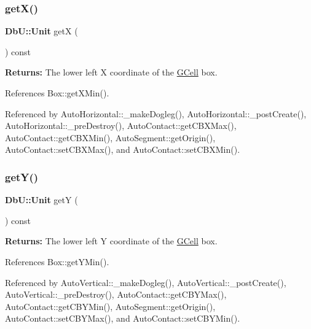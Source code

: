 \mbox{\label{classKatabatic_1_1GCell_a00b8f54c8171f6699e57de1b8c18eeb1}} 
\subsubsection{\texorpdfstring{get\+X()}{getX()}}
{\footnotesize\ttfamily \textbf{ Db\+U\+::\+Unit} getX (\begin{DoxyParamCaption}{ }\end{DoxyParamCaption}) const\hspace{0.3cm}{\ttfamily [inline]}}

{\bfseries Returns\+:} The lower left X coordinate of the \mbox{\hyperlink{classKatabatic_1_1GCell}{G\+Cell}} box. 

References Box\+::get\+X\+Min().



Referenced by Auto\+Horizontal\+::\+\_\+make\+Dogleg(), Auto\+Horizontal\+::\+\_\+post\+Create(), Auto\+Horizontal\+::\+\_\+pre\+Destroy(), Auto\+Contact\+::get\+C\+B\+X\+Max(), Auto\+Contact\+::get\+C\+B\+X\+Min(), Auto\+Segment\+::get\+Origin(), Auto\+Contact\+::set\+C\+B\+X\+Max(), and Auto\+Contact\+::set\+C\+B\+X\+Min().

\mbox{\label{classKatabatic_1_1GCell_a4580de6b074712e400d5d238ce3af054}} 
\subsubsection{\texorpdfstring{get\+Y()}{getY()}}
{\footnotesize\ttfamily \textbf{ Db\+U\+::\+Unit} getY (\begin{DoxyParamCaption}{ }\end{DoxyParamCaption}) const\hspace{0.3cm}{\ttfamily [inline]}}

{\bfseries Returns\+:} The lower left Y coordinate of the \mbox{\hyperlink{classKatabatic_1_1GCell}{G\+Cell}} box. 

References Box\+::get\+Y\+Min().



Referenced by Auto\+Vertical\+::\+\_\+make\+Dogleg(), Auto\+Vertical\+::\+\_\+post\+Create(), Auto\+Vertical\+::\+\_\+pre\+Destroy(), Auto\+Contact\+::get\+C\+B\+Y\+Max(), Auto\+Contact\+::get\+C\+B\+Y\+Min(), Auto\+Segment\+::get\+Origin(), Auto\+Contact\+::set\+C\+B\+Y\+Max(), and Auto\+Contact\+::set\+C\+B\+Y\+Min().

